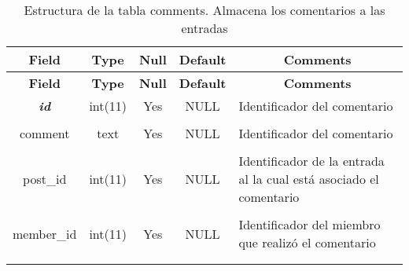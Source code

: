 %
%
\begin{longtable}{c c c c l}
	\multicolumn{1}{c}{\textbf{Field}} &
	\multicolumn{1}{c}{\textbf{Type}} &
	\multicolumn{1}{c}{\textbf{Null}} &
	\multicolumn{1}{c}{\textbf{Default}} &
	\multicolumn{1}{c}{\textbf{Comments}} \\ \hline \hline
\endfirsthead
	\multicolumn{1}{c}{\textbf{Field}} &
	\multicolumn{1}{c}{\textbf{Type}} &
	\multicolumn{1}{c}{\textbf{Null}} &
	\multicolumn{1}{c}{\textbf{Default}} &
	\multicolumn{1}{c}{\textbf{Comments}} \\ \hline \hline
\endhead \endfoot
	\textbf{\textit{id}} & int(11) & Yes & NULL & \parbox[t]{0.35\textwidth}{Identificador del comentario} \\ \\  \hline
	comment & text & Yes & NULL & \parbox[t]{0.35\textwidth}{Identificador del comentario} \\ \\  \hline
	post\_id & int(11) & Yes & NULL & \parbox[t]{0.35\textwidth}{Identificador de la entrada al la cual está asociado el comentario} \\ \\  \hline
	member\_id & int(11) & Yes & NULL & \parbox[t]{0.35\textwidth}{Identificador del miembro que realizó el comentario} \\ \\
\caption[Estructura de la tabla comments]{Estructura de la tabla comments. Almacena los comentarios a las entradas} \label{tab:blog_comments-structure} \\
\end{longtable}

